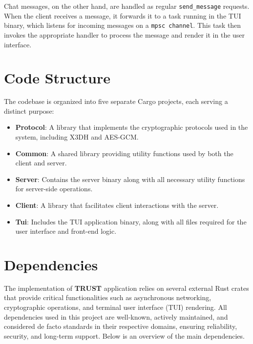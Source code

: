 Chat messages, on the other hand, are handled as regular \texttt{send\_message} requests. When the client receives a message, it forwards it to a task running in the TUI binary, which listens for incoming messages on a \texttt{mpsc channel}. This task then invokes the appropriate handler to process the message and render it in the user interface.

\section{Code Structure}
\label{sec:CodeStructure}


The codebase is organized into five separate Cargo projects, each serving a distinct purpose:

\begin{itemize}
    \item \textbf{Protocol}: A library that implements the cryptographic protocols used in the system, including X3DH and AES-GCM.
    \item \textbf{Common}: A shared library providing utility functions used by both the client and server.
    \item \textbf{Server}: Contains the server binary along with all necessary utility functions for server-side operations.
    \item \textbf{Client}: A library that facilitates client interactions with the server.
    \item \textbf{Tui}: Includes the TUI application binary, along with all files required for the user interface and front-end logic.
\end{itemize}

\section{Dependencies}
\label{sec:Dependecies}


The implementation of \textbf{TRUST} application relies on several external Rust crates that provide critical functionalities such as asynchronous networking, cryptographic operations, and terminal user interface (TUI) rendering. All dependencies used in this project are well-known, actively maintained, and considered de facto standards in their respective domains, ensuring reliability, security, and long-term support. Below is an overview of the main dependencies.   

